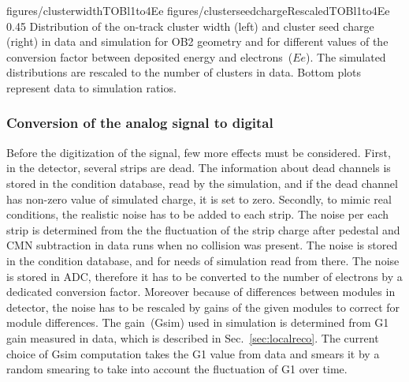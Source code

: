                  {figures/clusterwidthTOBl1to4Ee}
                 {figures/clusterseedchargeRescaledTOBl1to4Ee} %
                 {0.45}       %
                 { Distribution of the on-track cluster width (left) and cluster seed charge (right) in data and simulation for OB2 geometry and for different values of the conversion factor between deposited energy and electrons~($Ee$).  The simulated distributions are rescaled to the number of clusters in data.  Bottom plots represent data to simulation ratios. }


\subsubsection{Conversion of the analog signal to digital~\label{sec:digitize}}

Before the digitization of the signal, few more effects must be considered. First, in the detector, several strips are dead. The information about dead channels is stored in the condition database, read by the simulation, and if the dead channel has non-zero value of simulated charge, it is set to zero. Secondly, to mimic real conditions, the realistic noise has to be added to each strip. The noise per each strip is determined from the the fluctuation of the strip charge after pedestal and CMN subtraction in data runs when no collision was present. The noise is stored in the condition database, and for needs of simulation read from there. The noise is stored in ADC, therefore it has to be converted to the number of electrons by a dedicated conversion factor. Moreover because of differences between modules in detector, the noise has to be rescaled by gains of the given modules to correct for module differences. The gain~(Gsim) used in simulation is determined from G1 gain measured in data, which is described in Sec.~\ref{sec:localreco}. The current choice of  Gsim computation takes the G1 value from data and smears it by a random smearing to take into account the fluctuation of G1 over time.

